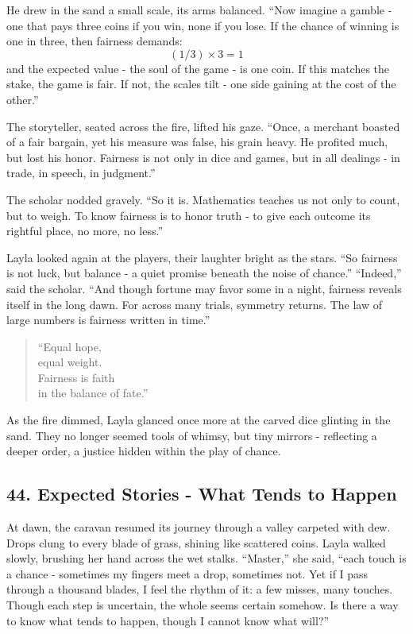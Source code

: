 \documentclass[
  letterpaper,
  DIV=11,
  numbers=noendperiod]{scrreprt}
\begin{document}
He drew in the sand a small scale, its arms balanced. ``Now imagine a
gamble - one that pays three coins if you win, none if you lose. If the
chance of winning is one in three, then fairness demands: \[
(1/3) \times 3 = 1
\] and the expected value - the soul of the game - is one coin. If this
matches the stake, the game is fair. If not, the scales tilt - one side
gaining at the cost of the other.''

The storyteller, seated across the fire, lifted his gaze. ``Once, a
merchant boasted of a fair bargain, yet his measure was false, his grain
heavy. He profited much, but lost his honor. Fairness is not only in
dice and games, but in all dealings - in trade, in speech, in
judgment.''

The scholar nodded gravely. ``So it is. Mathematics teaches us not only
to count, but to weigh. To know fairness is to honor truth - to give
each outcome its rightful place, no more, no less.''

Layla looked again at the players, their laughter bright as the stars.
``So fairness is not luck, but balance - a quiet promise beneath the
noise of chance.'' ``Indeed,'' said the scholar. ``And though fortune
may favor some in a night, fairness reveals itself in the long dawn. For
across many trials, symmetry returns. The law of large numbers is
fairness written in time.''

\begin{quote}
``Equal hope,\\
equal weight.\\
Fairness is faith\\
in the balance of fate.''
\end{quote}

As the fire dimmed, Layla glanced once more at the carved dice glinting
in the sand. They no longer seemed tools of whimsy, but tiny mirrors -
reflecting a deeper order, a justice hidden within the play of chance.

\subsection{44. Expected Stories - What Tends to
Happen}\label{expected-stories---what-tends-to-happen}

At dawn, the caravan resumed its journey through a valley carpeted with
dew. Drops clung to every blade of grass, shining like scattered coins.
Layla walked slowly, brushing her hand across the wet stalks.
``Master,'' she said, ``each touch is a chance - sometimes my fingers
meet a drop, sometimes not. Yet if I pass through a thousand blades, I
feel the rhythm of it: a few misses, many touches. Though each step is
uncertain, the whole seems certain somehow. Is there a way to know what
tends to happen, though I cannot know what will?''
\end{document}
